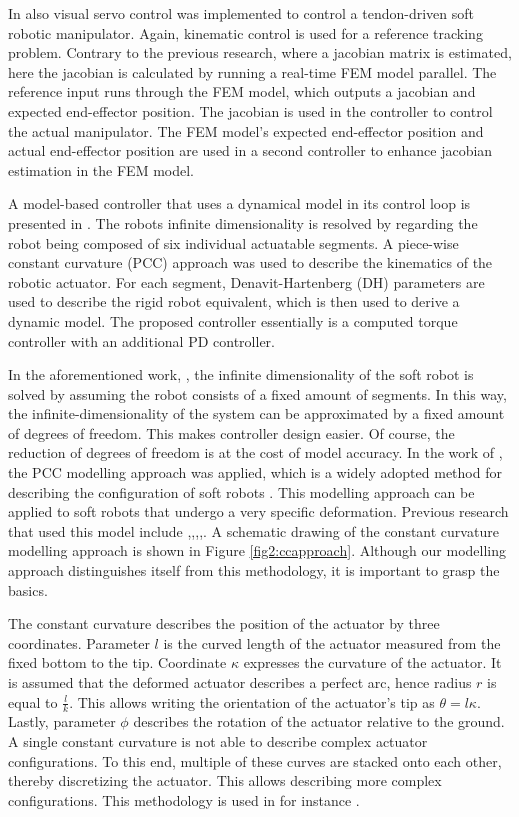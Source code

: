In \cite{zhang2017visual} also visual servo control was implemented to control a tendon-driven soft robotic manipulator. Again, kinematic control is used for a reference tracking problem. Contrary to the previous research, where a jacobian matrix is estimated, here the jacobian is calculated by running a real-time FEM model parallel. The reference input runs through the FEM model, which outputs a jacobian and expected end-effector position. The jacobian is used in the controller to control the actual manipulator. The FEM model's expected end-effector position and actual end-effector position are used in a second controller to enhance jacobian estimation in the FEM model.

A model-based controller that uses a dynamical model in its control loop is presented in \cite{della2020model}. The robots infinite dimensionality is resolved by regarding the robot being composed of six individual actuatable segments. A piece-wise constant curvature (PCC) approach was used to describe the kinematics of the robotic actuator. For each segment, Denavit-Hartenberg (DH) parameters are used to describe the rigid robot equivalent, which is then used to derive a dynamic model. The proposed controller essentially is a computed torque controller with an additional PD controller. 

In the aforementioned work, \cite{della2020model}, the infinite dimensionality of the soft robot is solved by assuming the robot consists of a fixed amount of segments. In this way, the infinite-dimensionality of the system can be approximated by a fixed amount of degrees of freedom. This makes controller design easier. Of course, the reduction of degrees of freedom is at the cost of model accuracy. In the work of \cite{della2020model}, the PCC modelling approach was applied, which is a widely adopted method for describing the configuration of soft robots \cite{ccapproach}. This modelling approach can be applied to soft robots that undergo a very specific deformation. Previous research that used this model include \cite{mahl2014bhakin},\cite{ccapproach},\cite{berkers},\cite{Falkenhahn2015},\cite{runge2017framework}. A schematic drawing of the constant curvature modelling approach is shown in Figure \ref{fig2:ccapproach}. Although our modelling approach distinguishes itself from this methodology, it is important to grasp the basics. 

The constant curvature describes the position of the actuator by three coordinates. Parameter $l$ is the curved length of the actuator measured from the fixed bottom to the tip. Coordinate $\kappa$ expresses the curvature of the actuator. It is assumed that the deformed actuator describes a perfect arc, hence radius $r$ is equal to $\frac{l}{k}$. This allows writing the orientation of the actuator's tip as $\theta = l\kappa$. Lastly, parameter $\phi$ describes the rotation of the actuator relative to the ground. A single constant curvature is not able to describe complex actuator configurations. To this end, multiple of these curves are stacked onto each other, thereby discretizing the actuator. This allows describing more complex configurations. This methodology is used in for instance \cite{Falkenhahn2015}.



